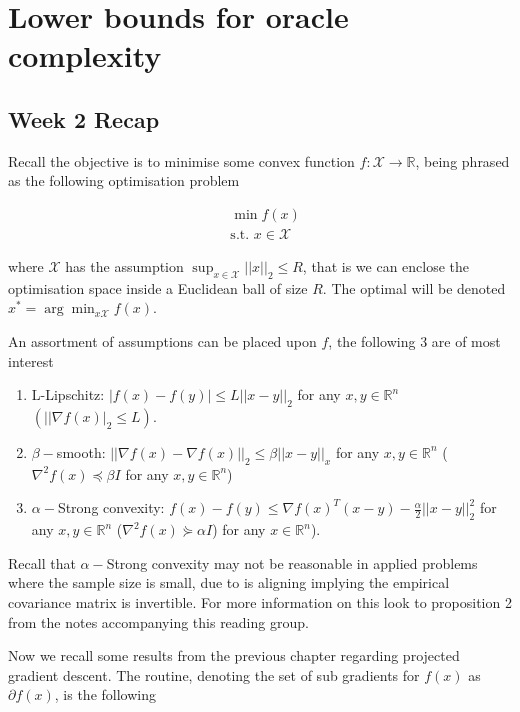 
\section{Lower bounds for oracle complexity}

\subsection{Week 2 Recap}

Recall the objective is to minimise some convex function $f: \mathcal{X} \rightarrow \mathbb{R}$, being phrased as the following optimisation problem

\begin{align}
& \min f(x) \\
& \text{s.t. } x \in \mathcal{X}
\end{align}


where $\mathcal{X}$ has the assumption $\sup_{x \in \mathcal{X}} ||x||_2 \leq R$, that is we can enclose the optimisation space inside a Euclidean ball of size $R$. The optimal will be denoted $x^{*} = \arg\min_{x  \mathcal{X}} f(x)$.  

An assortment of assumptions can be placed upon $f$, the following 3 are of most interest

\begin{enumerate}
\item{L-Lipschitz: $|f(x) - f(y)| \leq L ||x-y||_2$ for any $x,y \in \mathbb{R}^n$ $(||\nabla f(x)|_2 \leq L)$.}
\item{$\beta-$smooth: $||\nabla f(x) - \nabla f(x)||_2 \leq \beta||x-y||_x$ for any $x,y \in \mathbb{R}^n$ ($\nabla^2 f(x) \preccurlyeq \beta I$ for any $x,y \in \mathbb{R}^n$)}
\item{$\alpha-$Strong convexity: $f(x) - f(y) \leq \nabla f(x)^T (x-y) - \frac{\alpha}{2} ||x-y||_2^2$ for any $x,y \in \mathbb{R}^n$ ($\nabla^2 f(x)  \curlyeqsucc \alpha I$) for any $x \in \mathbb{R}^n$)}.
\end{enumerate}

Recall that $\alpha-$Strong convexity may not be reasonable in applied problems where the sample size is small, due to is aligning implying the empirical covariance matrix is invertible. For more information on this look  to proposition 2 from the notes accompanying this reading group. 


Now we recall some results from the previous chapter regarding projected gradient descent. The routine, denoting the set of sub gradients for $f(x)$ as $\partial f(x)$, is the following

